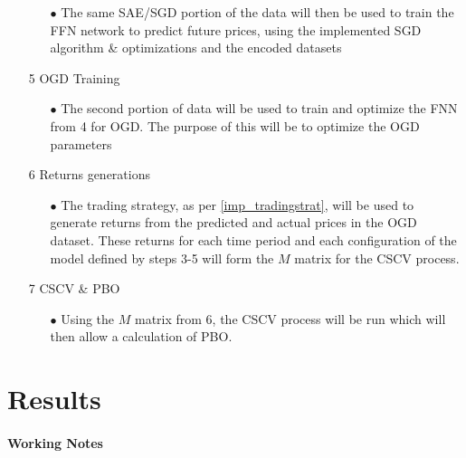 \documentclass[a4paper,latin]{paper}
\begin{document}
\begin{itemize}
	\begin{itemize}
		\item[$\bullet$] The same SAE/SGD portion of the data will then be used to train the FFN network to predict future prices, using the implemented SGD algorithm \& optimizations and the encoded datasets
	\end{itemize}			
	\item [5] OGD Training
	\begin{itemize}
		\item[$\bullet$] The second portion of data will be used to train and optimize the FNN from 4 for OGD. The purpose of this will be to optimize the OGD parameters		
	\end{itemize}			
	\item [6] Returns generations
	\begin{itemize}
		\item[$\bullet$] The trading strategy, as per \ref{imp_tradingstrat}, will be used to generate returns from the predicted and actual prices in the OGD dataset. These returns for each time period and each configuration of the model defined by steps 3-5 will form the $M$ matrix for the CSCV process.
	\end{itemize}	
	\item [7] CSCV \& PBO
	\begin{itemize}
		\item[$\bullet$] Using the $M$ matrix from 6, the CSCV process will be run which will then allow a calculation of PBO.
	\end{itemize}		
\end{itemize}


\newpage
\section{Results}\label{Results}
\paragraph{Working Notes}
\end{document}
